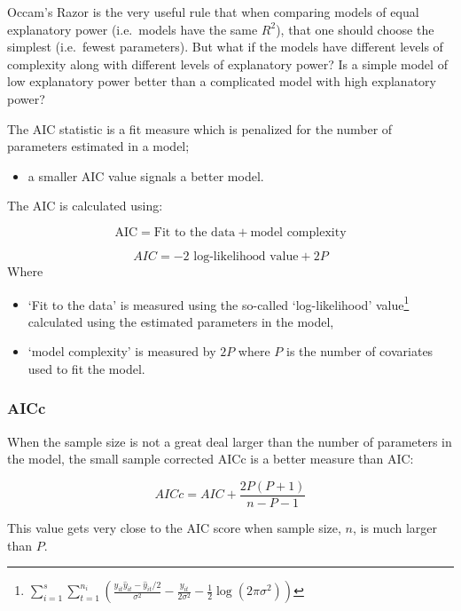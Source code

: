\documentclass[
  oneside]{krantz}
\providecommand{\tightlist}{%
  \setlength{\itemsep}{0pt}\setlength{\parskip}{0pt}}
\begin{document}
Occam's Razor is the very useful rule that when comparing models of equal explanatory power (i.e.~models have the same \(R^2\)), that one should choose the simplest (i.e.~fewest parameters). But what if the models have different levels of complexity along with different levels of explanatory power? Is a simple model of low explanatory power better than a complicated model with high explanatory power?

The AIC statistic is a fit measure which is penalized for the number of parameters estimated in a model;

\begin{itemize}
\tightlist
\item
  a smaller AIC value signals a better model.
\end{itemize}

The AIC is calculated using:

\[\textrm{AIC} =  \textrm{Fit to the data} +  \textrm{model complexity}\]

\begin{equation}\label{eq:aic}
AIC= -2 \textrm{ log-likelihood value} + 2P
\end{equation}
Where

\begin{itemize}
\tightlist
\item
  `Fit to the data' is measured using the so-called `log-likelihood' value\footnote{$\sum_{i=1}^{s}\sum_{t=1}^{n_i} \left( \frac{y_{it}\hat{y}_{it}-\hat{y}_{it}/2}{\sigma^2}-\frac{{y}_{it}}{2\sigma^2}-\frac{1}{2}\log (2\pi \sigma^2)\right)$ } calculated using the estimated parameters in the model,\\
\item
  `model complexity' is measured by \(2P\) where \(P\) is the number of covariates used to fit the model.
\end{itemize}

\hypertarget{aicc}{%
\subsubsection{AICc}\label{aicc}}

When the sample size is not a great deal larger than the number of parameters in the model, the small sample corrected AICc is a better measure than AIC:

\begin{equation}\label{eq:aicc}
AICc=AIC+\frac{2P(P+1)}{n-P-1}
\end{equation}

This value gets very close to the AIC score when sample size, \(n\), is much larger than \(P\).
\end{document}
